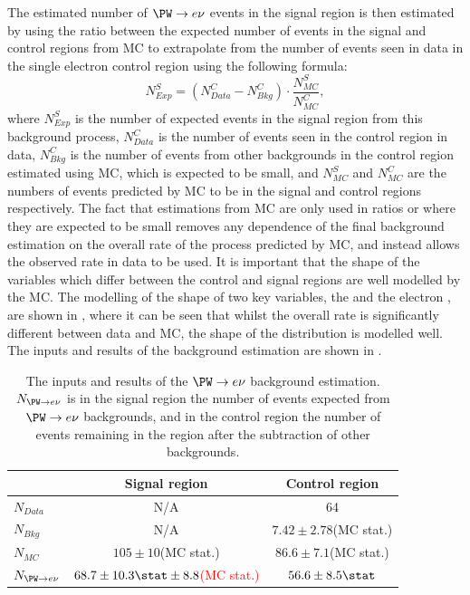 The estimated number of $\PW\rightarrow e\nu$ events in the signal region is then estimated by using the ratio between the expected number of events in the signal and control regions from \ac{MC} to extrapolate from the number of events seen in data in the single electron control region using the following formula:
\begin{equation}
  \label{eq:wdatabkg}
  N^{S}_{Exp}=\left(N^{C}_{Data}-N^{C}_{Bkg}\right)\cdot\frac{N^{S}_{MC}}{N^{C}_{MC}},
\end{equation}
where $N^{S}_{Exp}$ is the number of expected events in the signal region from this background process, $N^{C}_{Data}$ is the number of events seen in the control region in data, $N^{C}_{Bkg}$ is the number of events from other backgrounds in the control region estimated using \ac{MC}, which is expected to be small, and $N^{S}_{MC}$ and $N^{C}_{MC}$ are the numbers of events predicted by \ac{MC} to be in the signal and control regions respectively. The fact that estimations from \ac{MC} are only used in ratios or where they are expected to be small removes any dependence of the final background estimation on the overall rate of the process predicted by \ac{MC}, and instead allows the observed rate in data to be used. It is important that the shape of the variables which differ between the control and signal regions are well modelled by the \ac{MC}. The modelling of the shape of two key variables, the \MET and the electron \pt, are shown in , where it can be seen that whilst the overall rate is significantly different between data and \ac{MC}, the shape of the distribution is modelled well.  The inputs and results of the background estimation are shown in .

\begin{table}
  \caption{The inputs and results of the $\PW\rightarrow e\nu$ background estimation. $N_{\PW\rightarrow e\nu}$ is in the signal region the number of events expected from $\PW\rightarrow e\nu$ backgrounds, and in the control region the number of events remaining in the region after the subtraction of other backgrounds.}
  \label{tab:promptwenu}
  \begin{tabular}{lcc}
    \hline
    \hline
    & Signal region & Control region \\
    \hline
    \hline
    $N_{Data}$ & N/A & 64\\
    $N_{Bkg}$ & N/A & $7.42\pm2.78$(\ac{MC} stat.) \\
    $N_{MC}$& $105\pm10$(\ac{MC} stat.) & $86.6\pm 7.1$(\ac{MC} stat.) \\
    \hline
    $N_{\PW\rightarrow e\nu}$& \textcolor{red}{$68.7\pm 10.3\stat\pm 8.8$(MC stat.)} & $56.6\pm 8.5\stat$ \\
    \hline
    \hline
  \end{tabular}
\end{table}


